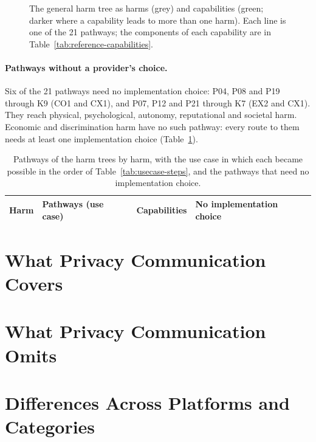 \begin{figure}[!t]
\centering

\caption[General harm tree]{The general harm tree as harms (grey) and capabilities (green; darker
where a capability leads to more than one harm). Each line is one of the 21 pathways;
the components of each capability are in Table~\ref{tab:reference-capabilities}.}
\label{fig:usecase-general}
\end{figure}

\paragraph{Pathways without a provider's choice.} Six of the 21 pathways need no implementation
choice: P04, P08 and P19 through K9 (CO1 and CX1), and P07, P12 and P21 through K7 (EX2 and CX1).
They reach physical, psychological, autonomy, reputational and societal harm. Economic and
discrimination harm have no such pathway: every route to them needs at least one implementation
choice (Table~\ref{tab:usecase-harms}).

\begin{table}[H]
\centering
\begin{singlespace}
\caption[Pathways of the harm trees by harm]{Pathways of the harm trees by harm, with the use
case in which each became possible in the order of Table~\ref{tab:usecase-steps}, and the
pathways that need no implementation choice.}
\label{tab:usecase-harms}
\footnotesize
\begin{tabularx}{\textwidth}{@{}>{\raggedright\arraybackslash}p{2.9cm}>{\raggedright\arraybackslash}X>{\raggedright\arraybackslash}p{2.3cm}>{\raggedright\arraybackslash}p{2.2cm}@{}}
\toprule
\textbf{Harm} & \textbf{Pathways (use case)} & \textbf{Capabilities} & \textbf{No implementation choice} \\
\midrule
\end{tabularx}
\end{singlespace}
\end{table}

\section{What Privacy Communication Covers}

\section{What Privacy Communication Omits}

\section{Differences Across Platforms and Categories}


